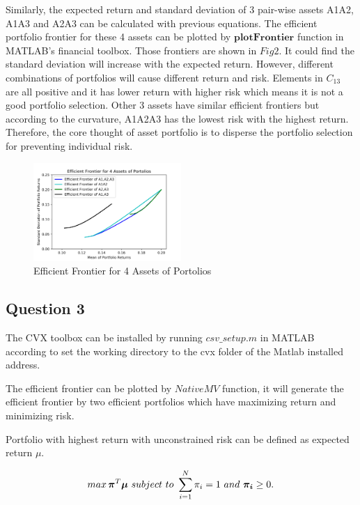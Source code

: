 \documentclass[sigconf]{acmart}
\begin{document}
Similarly, the expected return and standard deviation of 3 pair-wise assets A1A2, A1A3 and A2A3 can be calculated with previous equations.
The efficient portfolio frontier for these 4 assets can be plotted by $\bm{plotFrontier}$ function in MATLAB's financial toolbox. Those frontiers are shown in $Fig2$. It could find the standard deviation will increase with the expected return. However, different combinations of portfolios will cause different return and risk. Elements in $C_{13}$ are all positive and it has lower return with higher risk which means it is not a good portfolio selection. Other 3 assets have similar efficient frontiers but according to the curvature, A1A2A3 has the lowest risk with the highest return. Therefore, the core thought of asset portfolio is to disperse the portfolio selection for preventing individual risk. 

\begin{figure}[htbp]
    \centering
    \includegraphics[width=0.5\textwidth]{2.png}
    \caption{\label{}Efficient Frontier for 4 Assets of Portolios}
\end{figure}


\subsection{Question 3}

The CVX toolbox can be installed by running $csv\_setup.m$ in MATLAB according to set the working directory to the cvx folder of the Matlab installed address. 

The efficient frontier can be plotted by $NativeMV$ function, it will generate the efficient frontier by two efficient portfolios which have maximizing return and minimizing risk.

Portfolio with highest return with unconstrained risk can be defined as expected return $\mu$. 

\begin{equation} \label{eq1}
\setlength{\abovedisplayskip}{3pt}
\setlength{\belowdisplayskip}{3pt}
max\,\bm{\pi}^{T}\bm{\mu}\ subject\ to\ \sum_{i=1}^{N}\pi_{i}=1\ and\ \bm{\pi_{i}}\geq 0.
\end{equation}
\end{document}
